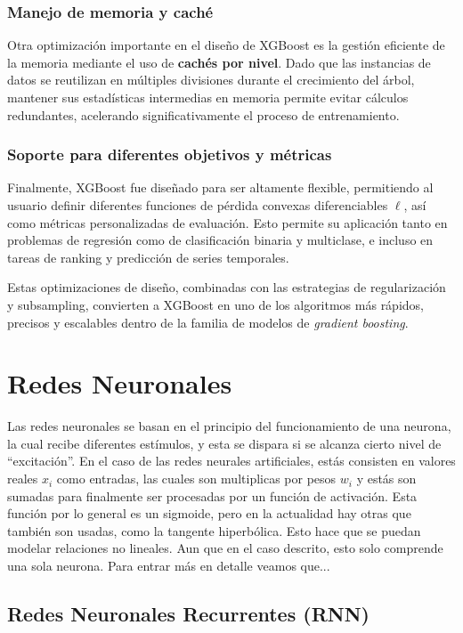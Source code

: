 \documentclass[12pt,letterpaper]{article}
\begin{document}
\subsubsection{Manejo de memoria y caché}
Otra optimización importante en el diseño de XGBoost es la gestión eficiente de la memoria mediante el uso de \textbf{cachés por nivel}. Dado que las instancias de datos se reutilizan en múltiples divisiones durante el crecimiento del árbol, mantener sus estadísticas intermedias en memoria permite evitar cálculos redundantes, acelerando significativamente el proceso de entrenamiento.

\subsubsection{Soporte para diferentes objetivos y métricas}
Finalmente, XGBoost fue diseñado para ser altamente flexible, permitiendo al usuario definir diferentes funciones de pérdida convexas diferenciables \(\ell\), así como métricas personalizadas de evaluación. Esto permite su aplicación tanto en problemas de regresión como de clasificación binaria y multiclase, e incluso en tareas de ranking y predicción de series temporales.

Estas optimizaciones de diseño, combinadas con las estrategias de regularización y subsampling, convierten a XGBoost en uno de los algoritmos más rápidos, precisos y escalables dentro de la familia de modelos de \textit{gradient boosting}.

\section*{Redes Neuronales}
Las redes neuronales se basan en el principio del funcionamiento de una neurona, la cual recibe diferentes estímulos, y esta se dispara si se alcanza cierto nivel de ``excitación''. En el caso de las redes neurales artificiales, estás consisten en valores reales $x_i$ como entradas, las cuales son multiplicas por pesos $w_i$ y estás son sumadas para finalmente ser procesadas por un función de activación. Esta función por lo general es un sigmoide, pero en la actualidad hay otras que también son usadas, como la tangente hiperbólica. Esto hace que se puedan modelar relaciones no lineales. Aun que en el caso descrito, esto solo comprende una sola neurona. Para entrar más en detalle veamos que...


\subsection{Redes Neuronales Recurrentes (RNN)}
\end{document}
